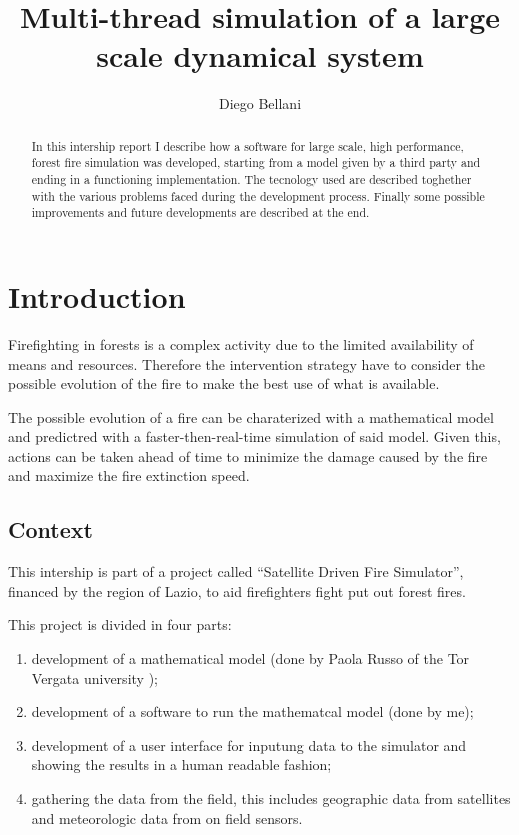 \documentclass[Lau]{sapthesis} %
\title{Multi-thread simulation of a large scale dynamical system}
\author{Diego Bellani}
\begin{document}
\frontmatter
\maketitle

\begin{abstract}
In this intership report I describe how a software for large scale, high
performance, forest fire simulation was developed, starting from a model given
by a third party and ending in a functioning implementation. The tecnology used
are described toghether with the various problems faced during the development
process. Finally some possible improvements and future developments are
described at the end.
\end{abstract}

\tableofcontents
\listoffigures
\listoftables

\mainmatter

\section{Introduction}%

Firefighting in forests is a complex activity due to the limited availability of
means and resources. Therefore the intervention strategy have to consider the
possible evolution of the fire to make the best use of what is available.

The possible evolution of a fire can be charaterized with a mathematical model
and predictred with a faster-then-real-time simulation of said model. Given
this, actions can be taken ahead of time to minimize the damage caused by the
fire and maximize the fire extinction speed.

\subsection{Context}

This intership is part of a project called ``Satellite Driven Fire Simulator'',
financed by the region of Lazio, to aid firefighters fight put out forest fires.

This project is divided in four parts:

\begin{enumerate}
\item development of a mathematical model (done by Paola Russo of the Tor
Vergata university \cite{mod});
\item \label{enum:my_work} development of a software to run the mathematcal
model (done by me);
\item \label{enum:interaction} development of a user interface for inputung data
to the simulator and showing the results in a human readable fashion;
\item \label{enum:data} gathering the data from the field, this includes
geographic data from satellites \cite{cop} and meteorologic data from on field
sensors.
\end{enumerate}
\end{document}
